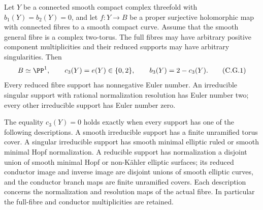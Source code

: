 \begin{theorem}
\label{cdp:st:C.2.G.1}

Let $Y$ be a connected smooth compact complex threefold with
$b_1(Y)=b_2(Y)=0$, and let $f:Y\to B$ be a proper surjective
holomorphic map with connected fibres to a smooth compact curve.
Assume that the smooth general fibre is a complex two-torus.
The full fibres may have arbitrary positive component multiplicities
and their reduced supports may have arbitrary singularities. Then
\[
 B\simeq\PP^1,\qquad
 c_3(Y)=e(Y)\in\{0,2\},\qquad b_3(Y)=2-c_3(Y).
 \tag{C.G.1}\label{cdp:eq:C.G.1}
\]
Every reduced fibre support has nonnegative Euler number.
An irreducible singular support with rational normalization
resolution has Euler number two; every other irreducible support
has Euler number zero.

The equality $c_3(Y)=0$ holds exactly when every support has one
of the following descriptions. A smooth irreducible support has
a finite unramified torus cover. A singular irreducible support
has smooth minimal elliptic ruled or smooth minimal Hopf
normalization. A reducible support has normalization a disjoint
union of smooth minimal Hopf or non-K\"ahler elliptic surfaces;
its reduced conductor image and inverse image are disjoint
unions of smooth elliptic curves, and the conductor branch maps
are finite unramified covers. Each description concerns the
normalization and resolution maps of the actual fibre. In
particular the full-fibre and conductor multiplicities are
retained.
\end{theorem}